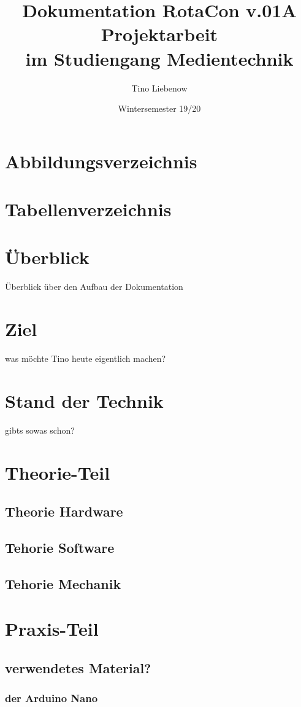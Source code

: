 \documentclass[a4paper, twoside, 10pt]{article}
\title{
	\Huge Dokumentation RotaCon v.01A
	\\
	\Large Projektarbeit
	\\
	im Studiengang Medientechnik}
\author{Tino Liebenow}
\date{Wintersemester 19/20}
\begin{document}
	\maketitle
	\newpage
	\tableofcontents
	\newpage
	\section*{Abbildungsverzeichnis}
	\newpage
	\section*{Tabellenverzeichnis}
	\newpage
	\section{Überblick}
		Überblick über den Aufbau der Dokumentation
	\section{Ziel}
		was möchte Tino heute eigentlich machen? 
	\section{Stand der Technik}	
		gibts sowas schon?
	\section{Theorie-Teil}
		\subsection{Theorie Hardware}
		\subsection{Tehorie Software}
		\subsection{Tehorie Mechanik}
	\section{Praxis-Teil}
		\subsection{verwendetes Material?}
			\subsubsection{der Arduino Nano}
\end{document}
